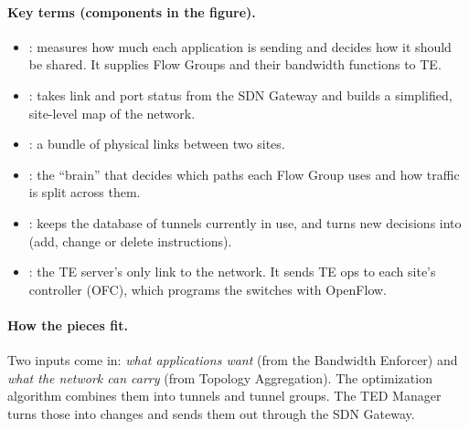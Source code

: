 \paragraph{Key terms (components in the figure).}
\begin{itemize}
\item {}: measures how much each application is sending and decides how it should be shared. It supplies Flow Groups and their bandwidth functions to TE.
\item {}: takes link and port status from the SDN Gateway and builds a simplified, site-level map of the network.
\item {}: a bundle of physical links between two sites.
\item {}: the ``brain'' that decides which paths each Flow Group uses and how traffic is split across them.
\item {}: keeps the database of tunnels currently in use, and turns new decisions into  (add, change or delete instructions).
\item {}: the TE server's only link to the network. It sends TE ops to each site's controller (OFC), which programs the switches with OpenFlow.
\end{itemize}

\paragraph{How the pieces fit.} Two inputs come in: \emph{what applications want} (from the Bandwidth Enforcer) and \emph{what the network can carry} (from Topology Aggregation). The optimization algorithm combines them into tunnels and tunnel groups. The TED Manager turns those into changes and sends them out through the SDN Gateway.

